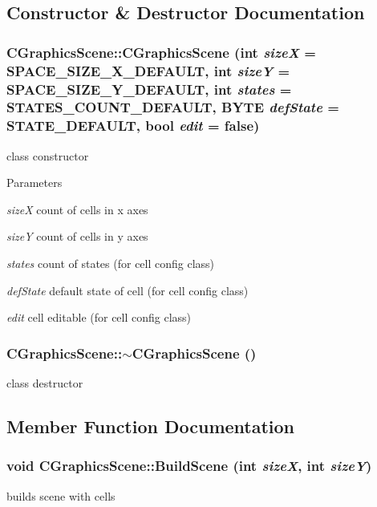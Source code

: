 \subsection{Constructor \& Destructor Documentation}
\hypertarget{classCGraphicsScene_a41c5f62f60a2eb61d473d8cfa4455c36}{
\subsubsection[{CGraphicsScene}]{\setlength{\rightskip}{0pt plus 5cm}CGraphicsScene::CGraphicsScene (int {\em sizeX} = {\ttfamily SPACE\_\-SIZE\_\-X\_\-DEFAULT}, \/  int {\em sizeY} = {\ttfamily SPACE\_\-SIZE\_\-Y\_\-DEFAULT}, \/  int {\em states} = {\ttfamily STATES\_\-COUNT\_\-DEFAULT}, \/  BYTE {\em defState} = {\ttfamily STATE\_\-DEFAULT}, \/  bool {\em edit} = {\ttfamily false})}}
\label{classCGraphicsScene_a41c5f62f60a2eb61d473d8cfa4455c36}
class constructor


\begin{DoxyParams}{Parameters}
\item[{\em sizeX}]count of cells in x axes \item[{\em sizeY}]count of cells in y axes \item[{\em states}]count of states (for cell config class) \item[{\em defState}]default state of cell (for cell config class) \item[{\em edit}]cell editable (for cell config class) \end{DoxyParams}
\hypertarget{classCGraphicsScene_a738153c68b9a91316fe4ec3b2d659f59}{
\subsubsection[{$\sim$CGraphicsScene}]{\setlength{\rightskip}{0pt plus 5cm}CGraphicsScene::$\sim$CGraphicsScene ()}}
\label{classCGraphicsScene_a738153c68b9a91316fe4ec3b2d659f59}
class destructor 

\subsection{Member Function Documentation}
\hypertarget{classCGraphicsScene_ad609155f1d601db1dd39eb4c6fbfb3c8}{
\subsubsection[{BuildScene}]{\setlength{\rightskip}{0pt plus 5cm}void CGraphicsScene::BuildScene (int {\em sizeX}, \/  int {\em sizeY})}}
\label{classCGraphicsScene_ad609155f1d601db1dd39eb4c6fbfb3c8}
builds scene with cells


